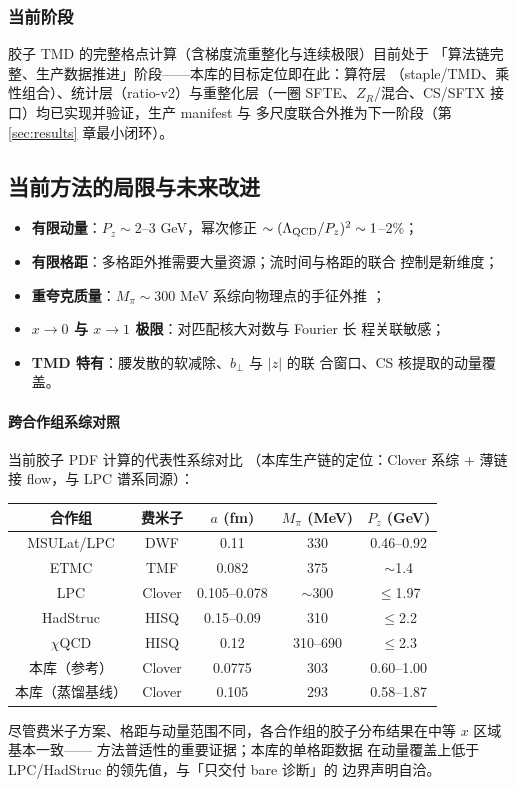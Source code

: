 \documentclass[11pt,a4paper]{ctexart}
\newcommand{\LaMET}{\text{LaMET}}
\newcommand{\abs}[1]{\lvert #1\rvert}
\newcommand{\bperp}{b_{\perp}}
\begin{document}
\subsubsection{当前阶段}

胶子 TMD 的完整格点计算（含梯度流重整化与连续极限）目前处于
「算法链完整、生产数据推进」阶段——本库的目标定位即在此：算符层
（staple/TMD、乘性组合）、统计层（ratio-v2）与重整化层（一圈
SFTE、$Z_R$/混合、CS/SFTX 接口）均已实现并验证，生产 manifest 与
多尺度联合外推为下一阶段（第 \ref{sec:results} 章最小闭环）。

\subsection{当前方法的局限与未来改进}

\begin{itemize}
  \item \textbf{有限动量}：$P_z\sim2$--3 GeV，幂次修正
  $\sim(\Lambda_{\rm QCD}/P_z)^2\sim1$--2\%；
  \item \textbf{有限格距}：多格距外推需要大量资源；流时间与格距的联合
  控制是新维度；
  \item \textbf{重夸克质量}：$M_\pi\sim300$ MeV 系综向物理点的手征外推
  ；
  \item \textbf{$x\to0$ 与 $x\to1$ 极限}：对匹配核大对数与 Fourier 长
  程关联敏感；
  \item \textbf{TMD 特有}：腰发散的软减除、$\bperp$ 与 $\abs z$ 的联
  合窗口、CS 核提取的动量覆盖。
\end{itemize}

\paragraph{跨合作组系综对照}当前胶子 PDF 计算的代表性系综对比
（本库生产链的定位：Clover 系综 + 薄链接 flow，与 LPC 谱系同源）：

\begin{center}
\scriptsize
\begin{tabular}{c c c c c}
\toprule
\textbf{合作组} & \textbf{费米子} & \textbf{$a$ (fm)} &
\textbf{$M_\pi$ (MeV)} & \textbf{$P_z$ (GeV)} \\
\midrule
MSULat/LPC & DWF & 0.11 & 330 & 0.46--0.92 \\
ETMC & TMF & 0.082 & 375 & $\sim$1.4 \\
LPC & Clover & 0.105--0.078 & $\sim$300 & $\le$1.97 \\
HadStruc & HISQ & 0.15--0.09 & 310 & $\le$2.2 \\
$\chi$QCD & HISQ & 0.12 & 310--690 & $\le$2.3 \\
本库（参考） & Clover & 0.0775 & 303 & 0.60--1.00 \\
本库（蒸馏基线） & Clover & 0.105 & 293 & 0.58--1.87 \\
\bottomrule
\end{tabular}
\end{center}
尽管费米子方案、格距与动量范围不同，各合作组的胶子分布结果在中等
$x$ 区域基本一致——\LaMET{} 方法普适性的重要证据；本库的单格距数据
在动量覆盖上低于 LPC/HadStruc 的领先值，与「只交付 bare 诊断」的
边界声明自洽。
\end{document}
